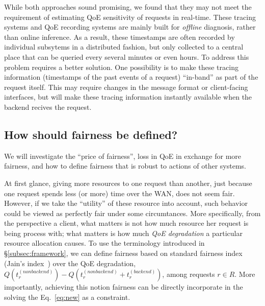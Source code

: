 While both approaches sound promising, we found that they may not meet the requirement of estimating QoE sensitivity of requests in real-time. 
These tracing systems and QoE recording systems are mainly built for {\em offline} diagnosis, rather than online inference. As a result, these timestamps are often recorded by individual subsytems in a distributed fashion, but only collected to a central place that can be queried every several minutes or even hours. 
To address this problem requires a better solution. 
One possibility is to make these tracing information (\eg timestamps of the past events of a request) ``in-band'' as part of the request itself. This may require changes in the message format or client-facing interfaces, but will make these tracing information instantly available when the backend recives the request.

\subsection{How should fairness be defined?}
\begin{task}
We will investigate the ``price of fairness'', \ie loss in QoE in exchange for more fairness, and how to define fairness that is robust to actions of other systems.
\end{task}

At first glance, giving more resources to one request than another, just because one request spends less (or more) time over the WAN, does not seem fair.
However, if we take the ``utility'' of these resource into account, such behavior could be viewed as perfectly fair under some circumtances.
More specifically, from the perspective a client, what matters is not how much resource her request is being process with; what matters is how much {\em QoE degradation} a particular resource allocation causes.
To use the  terminology  introduced in \S\ref{subsec:framework}, we can define fairness based on standard fairness index (\eg Jain's index~\cite{??}) over the QoE degradation, \ie $Q\left(t_{r}^{(nonbackend)}\right)-Q\left(t_{r}^{(nonbackend)}+t_{r}^{(backend)}\right)$, among requests $r\in R$.
More importantly, achieving this notion fairness can be directly incorporate in the solving the Eq.~\ref{eq:new} as a constraint.

